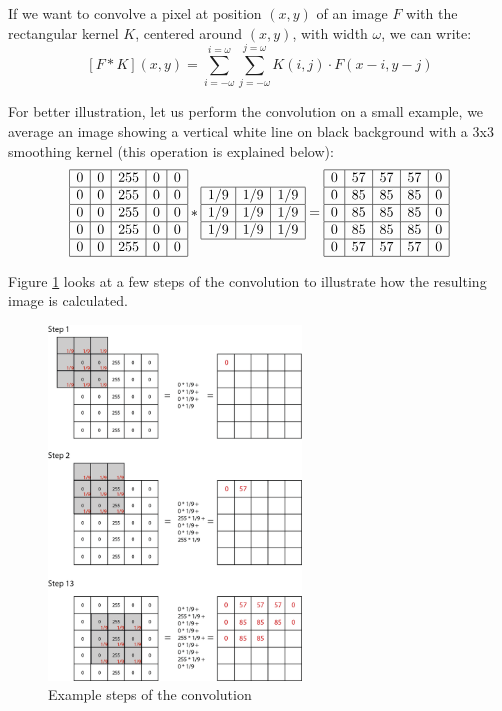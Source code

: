 If we want to convolve a pixel at position $(x,y)$ of an image $F$ with the rectangular kernel $K$, centered around $(x,y)$, with width $\omega$, we can write:
\[
	\left[F\ast K\right]\left(x,y\right)=\sum_{i=-\omega}^{i=\omega}\sum_{j=-\omega}^{j=\omega}K\left(i,j\right)\cdot F\left(x-i,y-j\right)
\]

For better illustration, let us perform the convolution on a small example, we average an image showing a vertical white line on black background with a 3x3 smoothing kernel (this operation is explained below):
\[
	\begin{array}{|c|c|c|c|c|}
	\hline
	0&0&255&0&0\\
\hline
0&0&255&0&0\\
\hline
0&0&255&0&0\\
\hline
0&0&255&0&0\\
\hline
0&0&255&0&0\\
\hline
	\end{array} 
	\ast 
	\begin{array}{|c|c|c|}
	\hline
	1/9&1/9&1/9\\
\hline
1/9&1/9&1/9\\
\hline
1/9&1/9&1/9\\
\hline
	\end{array}
	=
	\begin{array}{|c|c|c|c|c|}
	\hline
	0&57&57&57&0\\
\hline
0&85&85&85&0\\
\hline
0&85&85&85&0\\
\hline
0&85&85&85&0\\
\hline
0&57&57&57&0\\
\hline
	\end{array} 
\]

Figure \ref{fig:convolution-demo} looks at a few steps of the convolution to illustrate how the resulting image is calculated.

\begin{figure}[!ht]
	\centering
		\includegraphics[width=0.60\textwidth]{mod3/figures/convolution-demo.png}
	\caption{Example steps of the convolution}
	\label{fig:convolution-demo}
\end{figure}

